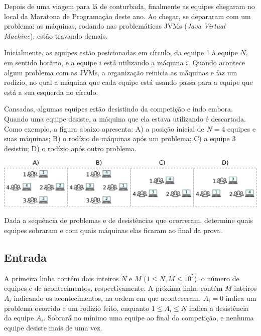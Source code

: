 \vspace{-0.3cm}
Depois de uma viagem para lá de conturbada, finalmente as equipes
chegaram no local da Maratona de Programação deste ano. Ao
chegar, se depararam com um problema:
as máquinas, rodando nas problemáticas JVMs (\textit{Java Virtual Machine}),
estão travando demais.

Inicialmente, as equipes estão posicionadas em círculo, da equipe 1 à equipe
$N$, em sentido horário, e a equipe $i$ está utilizando a máquina $i$.
Quando acontece algum problema com as JVMs, a organização reinicia as máquinas e faz
um rodízio, no qual a máquina que cada equipe está usando
passa para a equipe que está a sua esquerda no círculo.

Cansadas, algumas equipes estão desistindo da competição e
indo embora. Quando uma equipe desiste, a máquina que ela estava utilizando é
descartada. Como exemplo, a figura abaixo apresenta: A) a posição inicial de
$N=4$ equipes e suas máquinas; B) o rodízio de máquinas após um problema; C) a
equipe 3 desistiu; D) o rodízio após outro problema.

\vspace{-0.4cm}
\begin{center}
    \includegraphics[scale=0.45]{rage/rage.png}
\end{center}

\vspace{-0.4cm}
Dada a sequência de problemas e de desistências que ocorreram, determine quais equipes
sobraram e com quais máquinas elas ficaram ao final da prova.

\subsection*{Entrada}

A primeira linha contém dois inteiros $N$ e $M$
($1 \leq N, M \leq 10^5$), o número de equipes e de acontecimentos,
respectivamente. A próxima linha contém $M$ inteiros $A_i$ indicando os
acontecimentos, na ordem em que aconteceram. $A_i=0$ indica um problema ocorrido
e um rodizio feito, enquanto $1 \leq A_i \leq N$ indica a desistência da equipe
$A_i$. Sobrará no mínimo uma equipe ao final da competição, e
nenhuma equipe desiste mais de uma vez.

